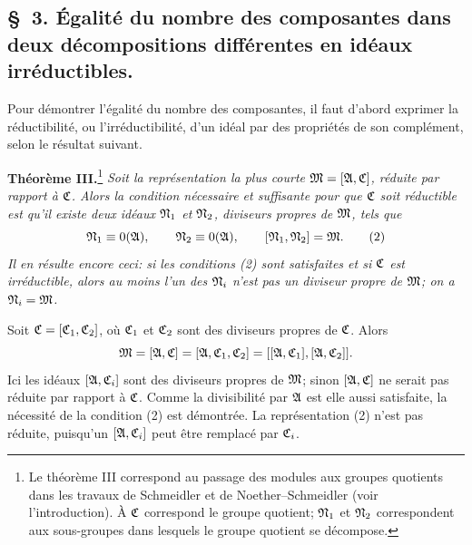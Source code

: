 \subsection*{\S~3. Égalité du nombre des composantes dans deux décompositions différentes en idéaux irréductibles.}

Pour démontrer l'égalité du nombre des composantes, il faut d'abord exprimer la réductibilité, ou l'irréductibilité, d'un idéal par des propriétés de son complément, selon le résultat suivant.

\textbf{Théorème III.}\footnote{Le théorème III correspond au passage des modules aux groupes quotients dans les travaux de Schmeidler et de Noether--Schmeidler (voir l'introduction). À $\mathfrak{C}$ correspond le groupe quotient; $\mathfrak{N}_1$ et $\mathfrak{N}_2$ correspondent aux sous-groupes dans lesquels le groupe quotient se décompose.} \emph{Soit la représentation la plus courte $\mathfrak{M}=[\mathfrak{A},\mathfrak{C}]$, réduite par rapport à $\mathfrak{C}$. Alors la condition nécessaire et suffisante pour que $\mathfrak{C}$ soit réductible est qu'il existe deux idéaux $\mathfrak{N}_1$ et $\mathfrak{N}_2$, diviseurs propres de $\mathfrak{M}$, tels que}
\begin{equation}
 \mathfrak{N}_1\equiv0(\mathfrak{A}),\qquad
 \mathfrak{N}_2\equiv0(\mathfrak{A}),\qquad
 [\mathfrak{N}_1,\mathfrak{N}_2]=\mathfrak{M}.
\tag{2}
\end{equation}
\emph{Il en résulte encore ceci: si les conditions (2) sont satisfaites et si $\mathfrak{C}$ est irréductible, alors au moins l'un des $\mathfrak{N}_i$ n'est pas un diviseur propre de $\mathfrak{M}$; on a $\mathfrak{N}_i=\mathfrak{M}$.}

Soit $\mathfrak{C}=[\mathfrak{C}_1,\mathfrak{C}_2]$, où $\mathfrak{C}_1$ et $\mathfrak{C}_2$ sont des diviseurs propres de $\mathfrak{C}$. Alors
\[
 \mathfrak{M}=[\mathfrak{A},\mathfrak{C}]=[\mathfrak{A},\mathfrak{C}_1,\mathfrak{C}_2]
      =[[\mathfrak{A},\mathfrak{C}_1],[\mathfrak{A},\mathfrak{C}_2]].
\]
Ici les idéaux $[\mathfrak{A},\mathfrak{C}_i]$ sont des diviseurs propres de $\mathfrak{M}$; sinon $[\mathfrak{A},\mathfrak{C}]$ ne serait pas réduite par rapport à $\mathfrak{C}$. Comme la divisibilité par $\mathfrak{A}$ est elle aussi satisfaite, la nécessité de la condition (2) est démontrée. La représentation (2) n'est pas réduite, puisqu'un $[\mathfrak{A},\mathfrak{C}_i]$ peut être remplacé par $\mathfrak{C}_i$.


